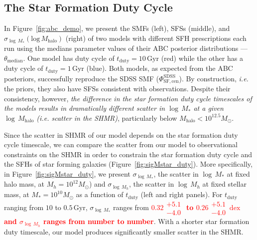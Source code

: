 \documentclass[12pt, letterpaper, preprint, tighten]{aastex}
\newcommand{\todo}[1]{{\bf \textcolor{red}{#1}}}
\begin{document}
\subsection{The Star Formation Duty Cycle} \label{sec:sfdutycycle}
In Figure~\ref{fig:abc_demo}, we present the SMFs (left), SFSs (middle), and 
$\sigma_{\log\,M_*}(\mathrm{log}\,M_\mathrm{halo})$ (right) of two models 
with different SFH prescriptions each run using the medians parameter values 
of their ABC posterior distributions --- $\theta_\mathrm{median}$. One model 
has duty cycle of $t_\mathrm{duty} = 10\,\mathrm{Gyr}$ (red) while the other 
has a duty cycle of $t_\mathrm{duty} = 1\,\mathrm{Gyr}$ (blue). Both models, 
as expected from the ABC posteriors, successfully reproduce the SDSS SMF 
($\Phi^\mathrm{SDSS}_\mathrm{SF,cen}$). By construction, \emph{i.e.} the priors, 
they also have SFSs consistent with observations. Despite their consistency, 
however, \emph{the difference in the star formation duty cycle timescales of 
the models results in dramatically different scatter in $\log\,M_*$ at a given 
$\log\,M_\mathrm{halo}$ (\emph{i.e.} scatter in the SHMR)}, particularly below 
$M_\mathrm{halo} < 10^{12.5}M_\odot$. 

Since the scatter in SHMR of our model depends on the star formation duty cycle
timescale, we can compare the scatter from our model to observational constraints
on the SHMR in order to constrain the star formation duty cycle and the SFHs of star 
forming galaxies (Figure~\ref{fig:sigMstar_duty}). More specifically, in 
Figure~\ref{fig:sigMstar_duty}, we present $\sigma_{\log\,M_*}$, the scatter in 
$\log\,M_*$ at fixed halo mass, at $M_h = 10^{12} M_\odot$) and $\sigma_{\log\,M_h}$, 
the scatter in $\log\,M_h$ at fixed stellar mass, at $M_* = 10^{10} M_\odot$  
as a function of $t_\mathrm{duty}$ (left and right panels). For $t_\mathrm{duty}$ 
ranging from $10$ to $0.5\,\mathrm{Gyr}$, $\sigma_{\log\,M_*}$ ranges from 
\todo{$0.32\substack{+5.1\\ -4.0}$ to $0.26\substack{+5.1\\ -4.0}\,\mathrm{dex}$ 
and $\sigma_{\log\,M_h}$ ranges from number to number}. With a shorter star formation 
duty timescale, our model produces significantly smaller scatter in the SHMR. 
\end{document}
